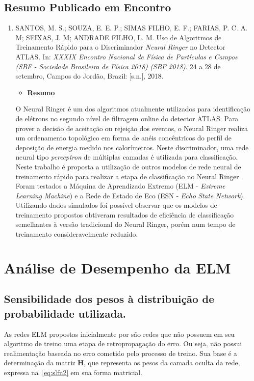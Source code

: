\begin{apendicesenv}
\section{Resumo Publicado em Encontro}
\begin{enumerate}
	\item SANTOS, M. S.; SOUZA, E. E. P.; SIMAS FILHO, E. F.; FARIAS, P. C. A. M; SEIXAS, J. M; ANDRADE FILHO, L. M. Uso de Algoritmos de Treinamento Rápido para o Discriminador \textit{Neural Ringer} no Detector ATLAS. In: \textit{XXXIX Encontro Nacional de Física de Partículas e Campos (SBF - Sociedade Brasileira de Física
	2018) (SBF 2018)}. 24 a 28 de setembro, Campos do Jordão, Brazil: [s.n.], 2018.
	\begin{itemize}
		\item \textbf{Resumo}
	\end{itemize}
	O Neural Ringer é um dos algoritmos atualmente utilizados para 	identificação de elétrons no segundo nível de filtragem online do	detector ATLAS. Para prover a decisão de aceitação ou rejeição dos 	eventos, o Neural Ringer realiza um ordenamento topológico em forma de	anéis concêntricos do perfil de deposição de energia medido nos calorímetros. Neste discriminador, uma rede neural tipo \textit{perceptron} de múltiplas camadas é utilizada para classificação. Neste trabalho é	proposta a utilização de outros modelos de rede neural de treinamento rápido para realizar a etapa de classificação no Neural Ringer. Foram testados a Máquina de Aprendizado Extremo (ELM - \textit{Extreme Learning	Machine}) e a Rede de Estado de Eco (ESN - \textit{Echo State Network}). Utilizando dados simulados foi possível observar que os modelos de 	treinamento propostos obtiveram resultados de eficiência de	classificação semelhantes à versão tradicional do Neural Ringer, porém 	num tempo de treinamento consideravelmente reduzido.
\end{enumerate}
\chapter{Análise de Desempenho da ELM}\label{chap:apendice2}
\section{Sensibilidade dos pesos à distribuição de probabilidade utilizada.}


As redes ELM propostas inicialmente por  são redes que não possuem em seu algoritmo de treino uma etapa de retropropagação do erro. Ou seja, não possui realimentação baseada no erro cometido pelo processo de treino. Sua base é a determinação da matriz $\mathbf{H}$, que representa os pesos da camada oculta da rede, expressa na~\autoref{eq:slfn2} em sua forma matricial.



\end{apendicesenv}
